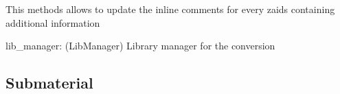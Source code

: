 \documentclass[letterpaper,10pt,english]{sphinxmanual}
\begin{document}
\begin{fulllineitems}
\begin{fulllineitems}
\end{fulllineitems}


\begin{fulllineitems}
\label{\detokenize{api/inputgeneration:matreader.Material.update_info}}
This methods allows to update the in\sphinxhyphen{}line comments for every zaids
containing additional information

lib\_manager: (LibManager) Library manager for the conversion

\end{fulllineitems}


\end{fulllineitems}



\subsection{Submaterial}
\label{\detokenize{api/inputgeneration:submaterial}}
\end{document}
